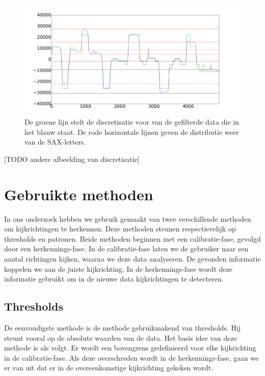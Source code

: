 \documentclass{article}
\begin{document}
\begin{figure}[h]
\centering
\includegraphics[width=\linewidth]{images/discretized_data}
\caption{De groene lijn stelt de discretisatie voor van de gefilterde data die in het blauw staat. De rode horizontale lijnen geven de distributie weer van de SAX-letters.}
\label{fig:discretization}
\end{figure}

[TODO andere afbeelding van discretisatie]

\section{Gebruikte methoden}

In ons onderzoek hebben we gebruik gemaakt van twee verschillende methoden om kijkrichtingen te herkennen. Deze methoden steunen respectievelijk op thresholds en patronen. Beide methoden beginnen met een calibratie-fase, gevolgd door een herkennings-fase. In de calibratie-fase laten we de gebruiker naar een aantal richtingen kijken, waarna we deze data analyseren. De gevonden informatie koppelen we aan de juiste kijkrichting. In de herkennings-fase wordt deze informatie gebruikt om in de nieuwe data kijkrichtingen te detecteren.

\subsection{Thresholds}

De eenvoudigste methode is de methode gebruikmakend van thresholds. Hij steunt vooral op de absolute waarden van de data. Het basis idee van deze methode is als volgt. Er wordt een bovengrens gedefinieerd voor elke kijkrichting in de calibratie-fase. Als deze overschreden wordt in de herkennings-fase, gaan we er van uit dat er in de overeenkomstige kijkrichting gekeken wordt.
\end{document}
